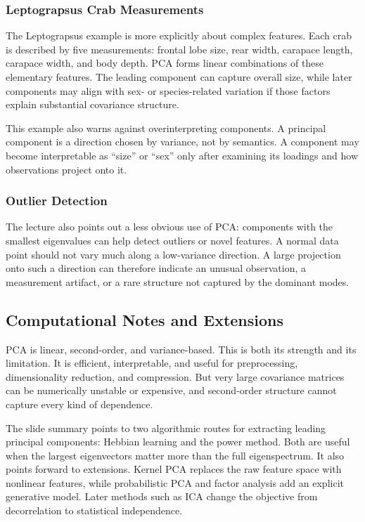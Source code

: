 \subsubsection{Leptograpsus Crab Measurements}

The Leptograpsus example is more explicitly about complex features. Each crab is described by five measurements: frontal lobe size, rear width, carapace length, carapace width, and body depth. PCA forms linear combinations of these elementary features. The leading component can capture overall size, while later components may align with sex- or species-related variation if those factors explain substantial covariance structure.

This example also warns against overinterpreting components. A principal component is a direction chosen by variance, not by semantics. A component may become interpretable as ``size'' or ``sex'' only after examining its loadings and how observations project onto it.

\subsubsection{Outlier Detection}

The lecture also points out a less obvious use of PCA: components with the smallest eigenvalues can help detect outliers or novel features. A normal data point should not vary much along a low-variance direction. A large projection onto such a direction can therefore indicate an unusual observation, a measurement artifact, or a rare structure not captured by the dominant modes.

\subsection{Computational Notes and Extensions}

PCA is linear, second-order, and variance-based. This is both its strength and its limitation. It is efficient, interpretable, and useful for preprocessing, dimensionality reduction, and compression. But very large covariance matrices can be numerically unstable or expensive, and second-order structure cannot capture every kind of dependence.

The slide summary points to two algorithmic routes for extracting leading principal components: Hebbian learning and the power method. Both are useful when the largest eigenvectors matter more than the full eigenspectrum. It also points forward to extensions. Kernel PCA replaces the raw feature space with nonlinear features, while probabilistic PCA and factor analysis add an explicit generative model. Later methods such as ICA change the objective from decorrelation to statistical independence.

